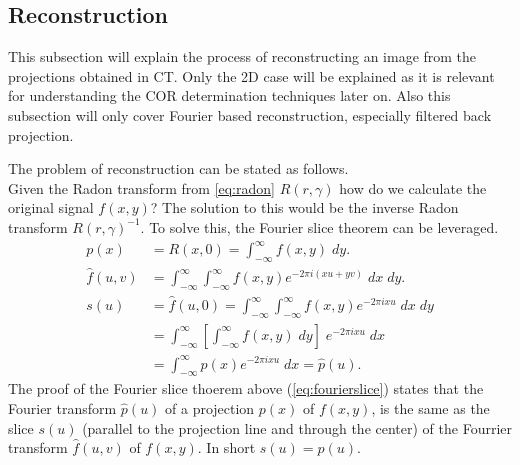 \documentclass[10pt,journal,compsoc]{IEEEtran}
\begin{document}
\subsection{Reconstruction}\label{ssec:reconstruction}
This subsection will explain the process of reconstructing an image from the projections obtained in CT.
Only the 2D case will be explained as it is relevant for understanding the COR determination techniques later on.
Also this subsection will only cover Fourier based reconstruction, especially filtered back projection.

The problem of reconstruction can be stated as follows.\\
Given the Radon transform from \cref{eq:radon} $R(r,\gamma)$ how do we calculate the original signal $f(x,y)$?
The solution to this would be the inverse Radon transform $R(r,\gamma)^{-1}$.
To solve this, the Fourier slice theorem can be leveraged.
%
\begin{align}
p(x) &= R(x,0) = \int_{-\infty}^{\infty} f(x,y)\;dy. 
\\
\hat{f}(u,v) &= \int_{-\infty}^{\infty}\int_{-\infty}^{\infty}f(x,y)e^{-2\pi i (xu+yv)}\;dx\;dy.
\\
s(u) &= \hat{f}(u,0) = \int_{-\infty}^{\infty}\int_{-\infty}^{\infty}f(x,y)e^{-2\pi i xu}\;dx\;dy
\label{eq:fourierslice}
\\
&= \int_{-\infty}^{\infty}\left[\int_{-\infty}^{\infty}f(x,y)\;dy\right]\;e^{-2\pi i xu}\;dx
\nonumber
\\
&= \int_{-\infty}^{\infty}p(x)e^{-2\pi i xu}\;dx = \hat{p}(u).
\nonumber
\end{align}
%
The proof of the Fourier slice thoerem above (\cref{eq:fourierslice}) states that the Fourier transform $\hat{p}(u)$ of a projection $p(x)$ of $f(x,y)$, is the same as the slice $s(u)$ (parallel to the projection line and through the center) of the Fourrier transform $\hat{f}(u,v)$ of $f(x,y)$.
In short $s(u) = \hat{p}(u)$.
\end{document}
